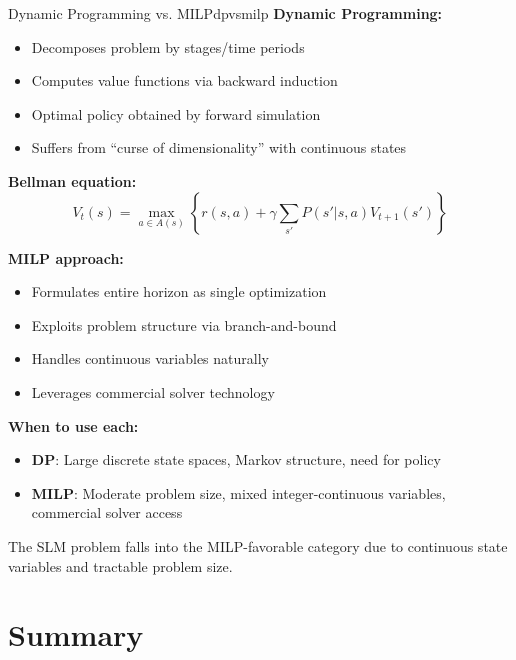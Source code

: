 \documentclass[11pt,a4paper]{article}
\begin{document}
\begin{keyconcept}{Dynamic Programming vs. MILP}{dpvsmilp}
\textbf{Dynamic Programming:}
\begin{itemize}
    \item Decomposes problem by stages/time periods
    \item Computes value functions via backward induction
    \item Optimal policy obtained by forward simulation
    \item Suffers from ``curse of dimensionality'' with continuous states
\end{itemize}

\textbf{Bellman equation:}
$$V_t(s) = \max_{a \in A(s)} \left\{ r(s, a) + \gamma \sum_{s'} P(s'|s,a) V_{t+1}(s') \right\}$$

\textbf{MILP approach:}
\begin{itemize}
    \item Formulates entire horizon as single optimization
    \item Exploits problem structure via branch-and-bound
    \item Handles continuous variables naturally
    \item Leverages commercial solver technology
\end{itemize}

\textbf{When to use each:}
\begin{itemize}
    \item \textbf{DP}: Large discrete state spaces, Markov structure, need for policy
    \item \textbf{MILP}: Moderate problem size, mixed integer-continuous variables, commercial solver access
\end{itemize}

The SLM problem falls into the MILP-favorable category due to continuous state variables and tractable problem size.
\end{keyconcept}

\section{Summary}
\end{document}
